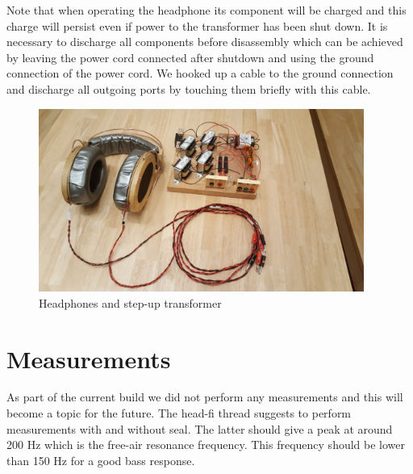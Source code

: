 \documentclass{article}
\begin{document}
Note that when operating the headphone its component will be charged and this charge will persist even if power to the transformer has been shut down. It is necessary to discharge all components before disassembly which can be achieved by leaving the power cord connected after shutdown and using the ground connection of the power cord. We hooked up a cable to the ground connection and discharge all outgoing ports by touching them briefly with this cable.

\begin{figure}[htb]
    \centering
    \includegraphics[width=0.95\textwidth]{images/headphones_and_amp.jpg}
    \caption{Headphones and step-up transformer}
    \label{f:amp:all}
\end{figure}

%
%
%
%

\section{Measurements}
\label{s:measurements}

As part of the current build we did not perform any measurements and this will become a topic for the future. The head-fi thread suggests to perform measurements with and without seal. The latter should give a peak at around 200 Hz which is the free-air resonance frequency. This frequency should be lower than 150 Hz for a good bass response.
\end{document}
